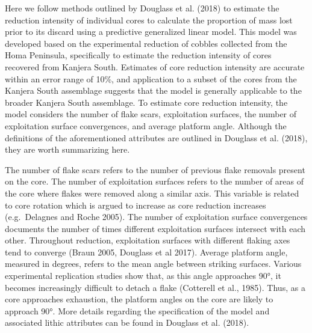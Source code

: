 \documentclass[]{elsarticle} %
\begin{document}
Here we follow methods outlined by Douglass et al. (2018) to estimate
the reduction intensity of individual cores to calculate the proportion
of mass lost prior to its discard using a predictive generalized linear
model. This model was developed based on the experimental reduction of
cobbles collected from the Homa Peninsula, specifically to estimate the
reduction intensity of cores recovered from Kanjera South. Estimates of
core reduction intensity are accurate within an error range of 10\%, and
application to a subset of the cores from the Kanjera South assemblage
suggests that the model is generally applicable to the broader Kanjera
South assemblage. To estimate core reduction intensity, the model
considers the number of flake scars, exploitation surfaces, the number
of exploitation surface convergences, and average platform angle.
Although the definitions of the aforementioned attributes are outlined
in Douglass et al. (2018), they are worth summarizing here.

The number of flake scars refers to the number of previous flake
removals present on the core. The number of exploitation surfaces refers
to the number of areas of the core where flakes were removed along a
similar axis. This variable is related to core rotation which is argued
to increase as core reduction increases (e.g.~Delagnes and Roche 2005).
The number of exploitation surface convergences documents the number of
times different exploitation surfaces intersect with each other.
Throughout reduction, exploitation surfaces with different flaking axes
tend to converge (Braun 2005, Douglass et al 2017). Average platform
angle, measured in degrees, refers to the mean angle between striking
surfaces. Various experimental replication studies show that, as this
angle approaches 90°, it becomes increasingly difficult to detach a
flake (Cotterell et al., 1985). Thus, as a core approaches exhaustion,
the platform angles on the core are likely to approach 90°. More details
regarding the specification of the model and associated lithic
attributes can be found in Douglass et al. (2018).
\end{document}
